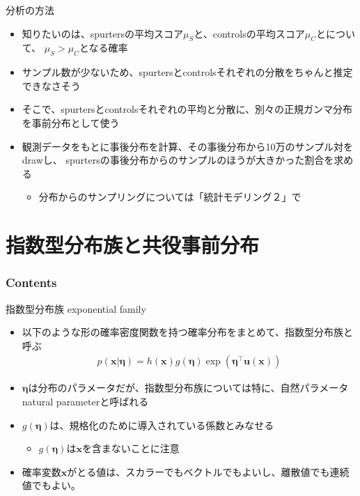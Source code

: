 \documentclass[aspectratio=169,unicode,dvipdfmx,14pt]{beamer}
\begin{document}
\begin{frame}{分析の方法}
\begin{itemize}
\item 知りたいのは、spurtersの平均スコア$\mu_S$と、controlsの平均スコア$\mu_C$とについて、
$\mu_S > \mu_C$となる確率
\item サンプル数が少ないため、spurtersとcontrolsそれぞれの分散をちゃんと推定できなさそう
\item そこで、spurtersとcontrolsそれぞれの平均と分散に、別々の正規ガンマ分布を事前分布として使う
\item 観測データをもとに事後分布を計算、その事後分布から10万のサンプル対をdrawし、
spurtersの事後分布からのサンプルのほうが大きかった割合を求める
\begin{itemize}
\item 分布からのサンプリングについては「統計モデリング２」で
\end{itemize}
\end{itemize}
\end{frame}


\section{指数型分布族と共役事前分布}

\begin{frame}\frametitle{Contents}
\Large \tableofcontents[currentsection]
\end{frame}

\begin{frame}{指数型分布族 exponential family}
\begin{itemize}
\item 以下のような形の確率密度関数を持つ確率分布をまとめて、指数型分布族と呼ぶ
\begin{align}
p(\bm{x}|\bm{\eta}) = h(\bm{x}) g(\bm{\eta}) \exp(\bm{\eta}^\intercal \bm{u}(\bm{x}))
\label{eq:expfam}
\end{align}
\item $\bm{\eta}$は分布のパラメータだが、指数型分布族については特に、自然パラメータnatural parameterと呼ばれる
\item $g(\bm{\eta})$は、規格化のために導入されている係数とみなせる
\begin{itemize}
\item $g(\bm{\eta})$は$\bm{x}$を含まないことに注意
\end{itemize}
\item 確率変数$\bm{x}$がとる値は、スカラーでもベクトルでもよいし、離散値でも連続値でもよい。
\end{itemize}
\end{frame}
\end{document}
